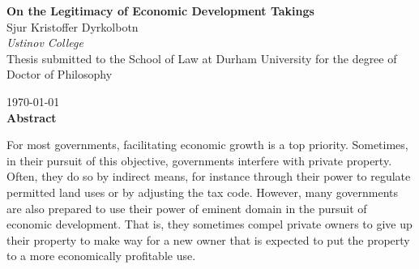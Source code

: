 

\cleardoublepage
{}

\begin{quoting}
  \singlespace
    \begin{center}
  {\LARGE \bfseries  On the Legitimacy of Economic Development Takings }\\
  \vspace*{0.5cm}
      {\large Sjur Kristoffer Dyrkolbotn}\\
  \vspace*{0.1cm}  
      {\large \emph{Ustinov College}}\\
  \vspace*{0.2cm}  
    {\normalsize Thesis submitted to the School of Law at Durham University for the degree of Doctor of Philosophy}

  \vspace*{0.2cm}  
    {\normalsize \today}\\
  \vspace*{0.5cm}  
    {\normalsize \bfseries Abstract}      
  \end{center}
  {\parindent0pt
For most governments, facilitating economic growth is a top priority. Sometimes, in their pursuit of this objective, governments interfere with private property. Often, they do so by indirect means, for instance through their power to regulate permitted land uses or by adjusting the tax code. However, many governments are also prepared to use their power of eminent domain in the pursuit of economic development. That is, they sometimes compel private owners to give up their property to make way for a new owner that is expected to put the property to a more economically profitable use. %
}
\vspace{0.7mm}


\end{quoting}
